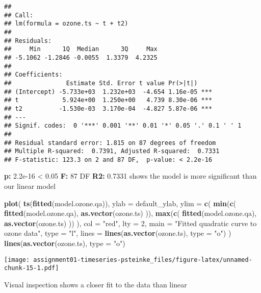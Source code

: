 \documentclass[]{article}
\newenvironment{Shaded}{\begin{snugshade}}{\end{snugshade}}
\newcommand{\DataTypeTok}[1]{\textcolor[rgb]{0.13,0.29,0.53}{#1}}
\newcommand{\DecValTok}[1]{\textcolor[rgb]{0.00,0.00,0.81}{#1}}
\newcommand{\KeywordTok}[1]{\textcolor[rgb]{0.13,0.29,0.53}{\textbf{#1}}}
\newcommand{\NormalTok}[1]{#1}
\newcommand{\StringTok}[1]{\textcolor[rgb]{0.31,0.60,0.02}{#1}}
\begin{document}
\begin{verbatim}
## 
## Call:
## lm(formula = ozone.ts ~ t + t2)
## 
## Residuals:
##     Min      1Q  Median      3Q     Max 
## -5.1062 -1.2846 -0.0055  1.3379  4.2325 
## 
## Coefficients:
##               Estimate Std. Error t value Pr(>|t|)    
## (Intercept) -5.733e+03  1.232e+03  -4.654 1.16e-05 ***
## t            5.924e+00  1.250e+00   4.739 8.30e-06 ***
## t2          -1.530e-03  3.170e-04  -4.827 5.87e-06 ***
## ---
## Signif. codes:  0 '***' 0.001 '**' 0.01 '*' 0.05 '.' 0.1 ' ' 1
## 
## Residual standard error: 1.815 on 87 degrees of freedom
## Multiple R-squared:  0.7391, Adjusted R-squared:  0.7331 
## F-statistic: 123.3 on 2 and 87 DF,  p-value: < 2.2e-16
\end{verbatim}

\textbf{p:} 2.2e-16 \textless{} 0.05 \textbf{F:} 87 DF \textbf{R2:}
0.7331 shows the model is more significant than our linear model

\begin{Shaded}
\begin{Highlighting}[]
\KeywordTok{plot}\NormalTok{(}
  \KeywordTok{ts}\NormalTok{(}\KeywordTok{fitted}\NormalTok{(model.ozone.qa)),}
  \DataTypeTok{ylab =}\NormalTok{ default_ylab,}
  \DataTypeTok{ylim =} \KeywordTok{c}\NormalTok{(}
    \KeywordTok{min}\NormalTok{(}\KeywordTok{c}\NormalTok{(}
      \KeywordTok{fitted}\NormalTok{(model.ozone.qa),}
      \KeywordTok{as.vector}\NormalTok{(ozone.ts)}
\NormalTok{    )),}
    \KeywordTok{max}\NormalTok{(}\KeywordTok{c}\NormalTok{(}
      \KeywordTok{fitted}\NormalTok{(model.ozone.qa),}
      \KeywordTok{as.vector}\NormalTok{(ozone.ts)}
\NormalTok{    ))}
\NormalTok{  ),}
  \DataTypeTok{col =} \StringTok{"red"}\NormalTok{,}
  \DataTypeTok{lty =} \DecValTok{2}\NormalTok{,}
  \DataTypeTok{main =} \StringTok{"Fitted quadratic curve to ozone data"}\NormalTok{,}
  \DataTypeTok{type =} \StringTok{"l"}\NormalTok{,}
  \DataTypeTok{lines =} \KeywordTok{lines}\NormalTok{(}\KeywordTok{as.vector}\NormalTok{(ozone.ts), }\DataTypeTok{type =} \StringTok{"o"}\NormalTok{)}
\NormalTok{  )}
\KeywordTok{lines}\NormalTok{(}\KeywordTok{as.vector}\NormalTok{(ozone.ts), }\DataTypeTok{type =} \StringTok{"o"}\NormalTok{)}
\end{Highlighting}
\end{Shaded}

\texttt{[image: assignment01-timeseries-psteinke\_files/figure-latex/unnamed-chunk-15-1.pdf]}

Visual inspection shows a closer fit to the data than linear
\end{document}
